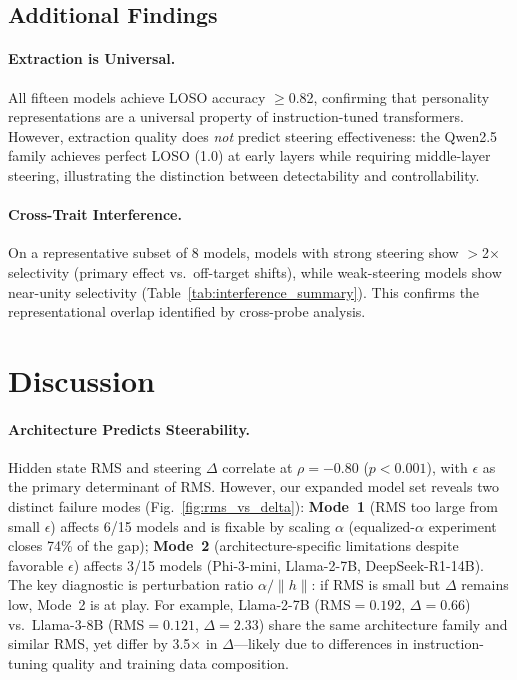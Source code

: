 \documentclass{article}
\begin{document}
\subsection{Additional Findings}\label{sec:additional}

\paragraph{Extraction is Universal.} All fifteen models achieve LOSO accuracy $\ge$0.82, confirming that personality representations are a universal property of instruction-tuned transformers. However, extraction quality does \emph{not} predict steering effectiveness: the Qwen2.5 family achieves perfect LOSO (1.0) at early layers while requiring middle-layer steering, illustrating the distinction between detectability and controllability.

\paragraph{Cross-Trait Interference.} On a representative subset of 8 models, models with strong steering show $>$2$\times$ selectivity (primary effect vs.\ off-target shifts), while weak-steering models show near-unity selectivity (Table~\ref{tab:interference_summary}). This confirms the representational overlap identified by cross-probe analysis.

\section{Discussion}\label{sec:discussion}

\paragraph{Architecture Predicts Steerability.}
Hidden state RMS and steering $\Delta$ correlate at $\rho{=}{-}0.80$ ($p{<}0.001$), with $\epsilon$ as the primary determinant of RMS. However, our expanded model set reveals two distinct failure modes (Fig.~\ref{fig:rms_vs_delta}): \textbf{Mode~1} (RMS too large from small $\epsilon$) affects 6/15 models and is fixable by scaling $\alpha$ (equalized-$\alpha$ experiment closes 74\% of the gap); \textbf{Mode~2} (architecture-specific limitations despite favorable $\epsilon$) affects 3/15 models (Phi-3-mini, Llama-2-7B, DeepSeek-R1-14B). The key diagnostic is perturbation ratio $\alpha/\|h\|$: if RMS is small but $\Delta$ remains low, Mode~2 is at play. For example, Llama-2-7B (RMS${=}0.192$, $\Delta{=}0.66$) vs.\ Llama-3-8B (RMS${=}0.121$, $\Delta{=}2.33$) share the same architecture family and similar RMS, yet differ by 3.5$\times$ in $\Delta$---likely due to differences in instruction-tuning quality and training data composition.
\end{document}
